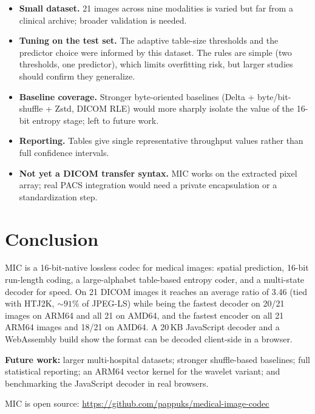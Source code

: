 \documentclass[11pt]{article}
\begin{document}
\begin{itemize}
  \item \textbf{Small dataset.} 21 images across nine modalities is varied but
  far from a clinical archive; broader validation is needed.
  \item \textbf{Tuning on the test set.} The adaptive table-size thresholds and
  the predictor choice were informed by this dataset. The rules are simple (two
  thresholds, one predictor), which limits overfitting risk, but larger studies
  should confirm they generalize.
  \item \textbf{Baseline coverage.} Stronger byte-oriented baselines (Delta +
  byte/bit-shuffle + Zstd, DICOM RLE) would more sharply isolate the value of
  the 16-bit entropy stage; left to future work.
  \item \textbf{Reporting.} Tables give single representative throughput values
  rather than full confidence intervals.
  \item \textbf{Not yet a DICOM transfer syntax.} MIC works on the extracted
  pixel array; real PACS integration would need a private encapsulation or a
  standardization step.
\end{itemize}

\section{Conclusion}

MIC is a 16-bit-native lossless codec for medical images: spatial prediction,
16-bit run-length coding, a large-alphabet table-based entropy coder, and a
multi-state decoder for speed. On 21 DICOM images it reaches an average
ratio of 3.46 (tied with HTJ2K, ${\sim}91\%$ of JPEG-LS) while being the
fastest decoder on 20/21 images on ARM64 and all 21 on AMD64, and the fastest
encoder on all 21 ARM64 images and 18/21 on AMD64. A 20\,KB JavaScript decoder
and a WebAssembly build show the format can be decoded client-side in a
browser.

\textbf{Future work:} larger multi-hospital datasets; stronger shuffle-based
baselines; full statistical reporting; an ARM64 vector kernel for the wavelet
variant; and benchmarking the JavaScript decoder in real browsers.

MIC is open source: \url{https://github.com/pappuks/medical-image-codec}
\end{document}
